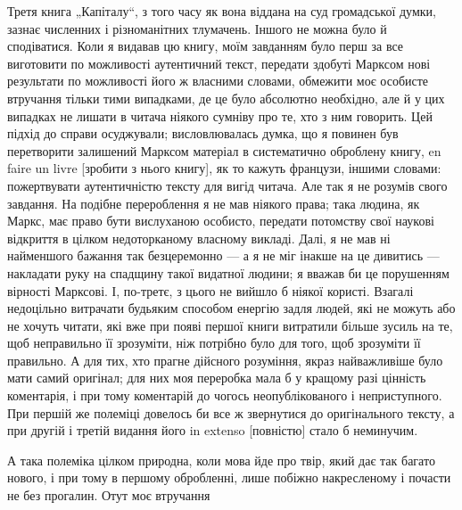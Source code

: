 
Третя книга „Капіталу“, з того часу як вона віддана на суд громадської думки, зазнає численних і
різноманітних тлумачень. Іншого не можна було й сподіватися. Коли я видавав цю книгу, моїм
завданням було перш за все виготовити по можливості аутентичний текст, передати здобуті Марксом
нові результати по можливості його ж власними словами, обмежити моє особисте втручання тільки тими випадками, де це
було абсолютно необхідно, але й у цих випадках не лишати в читача ніякого
сумніву про те, хто з ним говорить. Цей підхід до справи осуджували; висловлювалась думка, що я
повинен був перетворити залишений Марксом матеріал в систематично оброблену книгу, en faire un
livre [зробити з нього книгу], як то кажуть французи, іншими словами: пожертвувати аутентичністю
тексту для вигід читача. Але так я не розумів свого завдання. На подібне перероблення я не мав
ніякого права; така людина, як Маркс, має право бути вислуханою особисто, передати потомству
свої наукові відкриття в цілком недоторканому власному викладі. Далі, я не мав ні найменшого
бажання так безцеремонно — а я не міг інакше на це дивитись — накладати руку на спадщину такої видатної людини; я вважав би це порушенням вірності Марксові. І, по-третє, з цього не вийшло б
ніякої користі. Взагалі недоцільно витрачати будьяким способом енергію задля людей, які не можуть або не хочуть читати, які вже при появі першої книги витратили більше зусиль на те, щоб
неправильно її зрозуміти, ніж потрібно було для того, щоб зрозуміти її правильно. А для тих, хто
прагне дійсного розуміння, якраз найважливіше було мати самий оригінал; для них моя переробка
мала б у кращому разі цінність коментарія, і при тому коментарій до чогось неопублікованого і
неприступного. При першій же полеміці довелось би все ж звернутися до оригінального тексту, а
при другій і третій видання його in extenso [повністю] стало б неминучим.

А така полеміка цілком
природна, коли мова йде про твір, який дає так багато нового, і при тому в першому обробленні,
лише побіжно накресленому і почасти не без прогалин. Отут моє втручання
\parbreak{}  %

